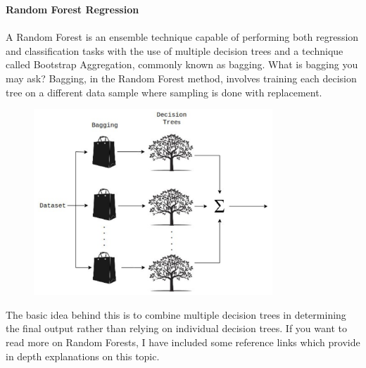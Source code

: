 \textbf{Random Forest Regression}\\\\
A Random Forest is an ensemble technique capable of performing both regression and
classification tasks with the use of multiple decision trees and a technique called Bootstrap
Aggregation, commonly known as bagging. What is bagging you may ask? Bagging, in the
Random Forest method, involves training each decision tree on a different data sample where
sampling is done with replacement.
\begin{figure}[H]
\centering
\includegraphics[width=0.8\textwidth]{media/rf}\label{fig:rf}
\label{fig:rf}
\end{figure}
The basic idea behind this is to combine multiple decision trees in determining the final output
rather than relying on individual decision trees. If you want to read more on Random Forests, I
have included some reference links which provide in depth explanations on this topic.\\\\


